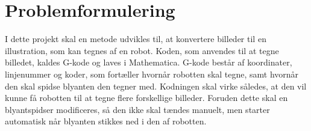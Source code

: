 \section{Problemformulering}
I dette projekt skal en metode udvikles til, at konvertere billeder til en illustration, som kan tegnes af en robot. Koden, som anvendes til at tegne billedet, kaldes G-kode og laves i Mathematica. G-kode består af koordinater, linjenummer og koder, som fortæller hvornår robotten skal tegne, samt hvornår den skal spidse blyanten den tegner med. Kodningen skal virke således, at den vil kunne få robotten til at tegne flere forskellige billeder. Foruden dette skal en blyantspidser modificeres, så den ikke skal tændes manuelt, men starter automatisk når blyanten stikkes ned i den af robotten.
